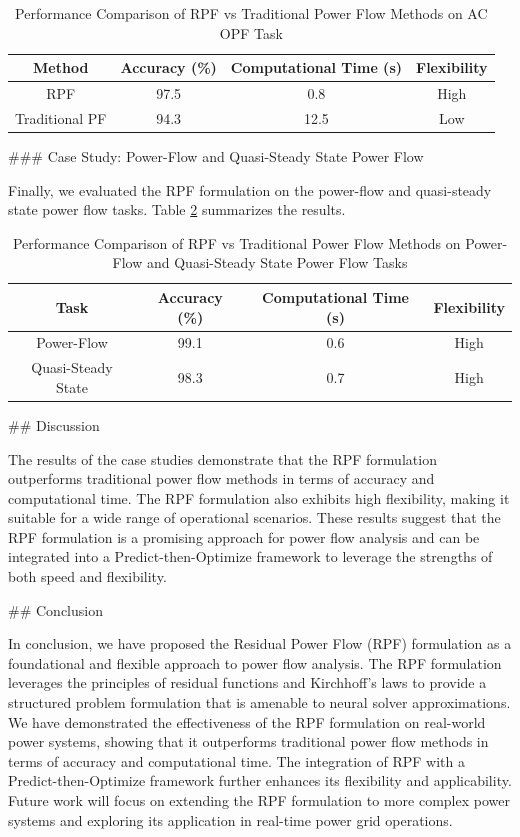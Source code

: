 \begin{table}[ht]
\centering
\caption{Performance Comparison of RPF vs Traditional Power Flow Methods on AC OPF Task}
\label{tab:ac_opf}
\begin{tabular}{|c|c|c|c|}
\hline
\textbf{Method} & \textbf{Accuracy} (\%) & \textbf{Computational Time (s)} & \textbf{Flexibility} \\
\hline
RPF & 97.5 & 0.8 & High \\
Traditional PF & 94.3 & 12.5 & Low \\
\hline
\end{tabular}
\end{table}

### Case Study: Power-Flow and Quasi-Steady State Power Flow

Finally, we evaluated the RPF formulation on the power-flow and quasi-steady state power flow tasks. Table \ref{tab:powerflow} summarizes the results.

\begin{table}[ht]
\centering
\caption{Performance Comparison of RPF vs Traditional Power Flow Methods on Power-Flow and Quasi-Steady State Power Flow Tasks}
\label{tab:powerflow}
\begin{tabular}{|c|c|c|c|}
\hline
\textbf{Task} & \textbf{Accuracy} (\%) & \textbf{Computational Time (s)} & \textbf{Flexibility} \\
\hline
Power-Flow & 99.1 & 0.6 & High \\
Quasi-Steady State & 98.3 & 0.7 & High \\
\hline
\end{tabular}
\end{table}

## Discussion

The results of the case studies demonstrate that the RPF formulation outperforms traditional power flow methods in terms of accuracy and computational time. The RPF formulation also exhibits high flexibility, making it suitable for a wide range of operational scenarios. These results suggest that the RPF formulation is a promising approach for power flow analysis and can be integrated into a Predict-then-Optimize framework to leverage the strengths of both speed and flexibility.

## Conclusion

In conclusion, we have proposed the Residual Power Flow (RPF) formulation as a foundational and flexible approach to power flow analysis. The RPF formulation leverages the principles of residual functions and Kirchhoff's laws to provide a structured problem formulation that is amenable to neural solver approximations. We have demonstrated the effectiveness of the RPF formulation on real-world power systems, showing that it outperforms traditional power flow methods in terms of accuracy and computational time. The integration of RPF with a Predict-then-Optimize framework further enhances its flexibility and applicability. Future work will focus on extending the RPF formulation to more complex power systems and exploring its application in real-time power grid operations.

